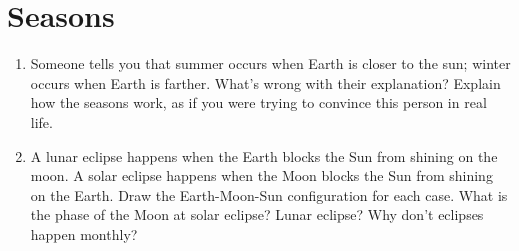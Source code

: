 \documentclass[11pt]{article}%
\begin{document}






\section{Seasons}
\begin{enumerate}
    \item Someone tells you that summer occurs when Earth is closer to the sun; winter occurs when Earth is farther. What's wrong with their explanation? Explain how the seasons work, as if you were trying to convince this person in real life.

    \item A lunar eclipse happens when the Earth blocks the Sun from shining on the moon. A solar eclipse happens when the Moon blocks the Sun from shining on the Earth. Draw the Earth-Moon-Sun configuration for each case. What is the phase of the Moon at solar eclipse? Lunar eclipse? Why don't eclipses happen monthly?

\end{enumerate}
\end{document}
